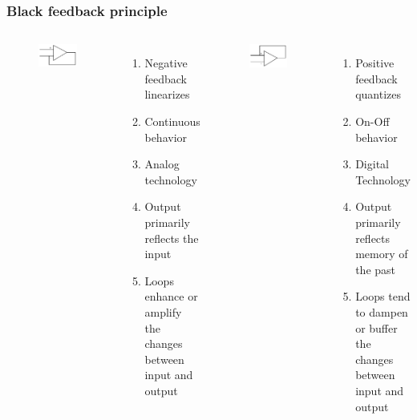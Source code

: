 \documentclass{beamer}
\begin{document}
\begin{frame}
\frametitle{Black feedback principle}
\vspace{-2ex}
\begin{columns}[c]

\begin{figure}
\includegraphics[width=1\linewidth]{negative}
\end{figure}
\vspace{-4ex}
\begin{enumerate}
\item Negative feedback linearizes
\item Continuous behavior
\item Analog technology
\item Output primarily reflects the input
\item Loops enhance or amplify the changes between input and output
\end{enumerate}

\begin{figure}
\includegraphics[width=1\linewidth]{positive}
\end{figure}
\vspace{-4ex}
\begin{enumerate}
\item Positive feedback quantizes
\item On-Off behavior
\item Digital Technology
\item Output primarily reflects memory of the past
\item Loops tend to dampen or buffer the changes between input and output
\end{enumerate}


\end{columns}
\end{frame}
\end{document}
